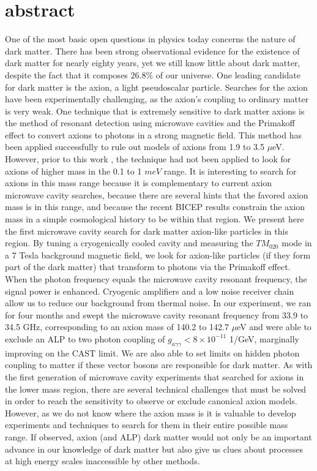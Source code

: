 \documentclass[12pt,twosides]{book}
\begin{document}
\section{abstract}

One of the most basic open questions in physics today concerns the nature of dark matter. There has been strong observational evidence for the existence of dark matter for nearly eighty years, yet we still know little about dark matter, despite the fact that it composes $26.8\%$ of our universe. One leading candidate for dark matter is the axion, a light pseudoscalar particle. Searches for the axion have been experimentally challenging, as the axion's coupling to ordinary matter is very weak. One technique that is extremely sensitive to dark matter axions is the method of resonant detection using microwave cavities and the Primakoff effect to convert axions to photons in a strong magnetic field. This method has been applied successfully to rule out models of axions from 1.9 to 3.5 $\mu$eV. However, prior to this work , the technique had not been applied to look for axions of higher mass in the 0.1 to 1 $meV$ range. It is interesting to search for axions in this mass range because it is complementary to current axion microwave cavity searches, because there are several hints that the favored axion mass is in this range, and because the recent BICEP results constrain the axion mass in a simple cosmological history to be within that region. We present here the first microwave cavity search for dark matter axion-like particles in this region. By tuning a cryogenically cooled cavity and measuring the $TM_{020}$ mode in a 7 Tesla background magnetic field, we look for axion-like particles (if they form part of the dark matter) that transform to photons via the Primakoff effect. When the photon frequency equals the microwave cavity resonant frequency, the signal power is enhanced. Cryogenic amplifiers and a low noise receiver chain allow us to reduce our background from thermal noise. In our experiment, we ran for four months and swept the microwave cavity resonant frequency from 33.9 to 34.5 GHz, corresponding to an axion mass of 140.2  to 142.7 $\mu$eV and were able to exclude an ALP to two photon coupling of $g_{a\gamma\gamma} < 8\times10^{-11}$ 1/GeV, marginally improving on the CAST limit. We are also able to set limits on hidden photon coupling to matter if these vector bosons are responsible for dark matter. As with the first generation of microwave cavity experiments that searched for axions in the lower mass region, there are several technical challenges that must be solved in order to reach the sensitivity to observe or exclude canonical axion models. However, as we do not know where the axion mass is it is valuable to develop experiments and techniques to search for them in their entire possible mass range. If observed, axion (and ALP) dark matter would not only be an important advance in our knowledge of dark matter but also give us clues about processes at high energy scales inaccessible by other methods.
\end{document}
